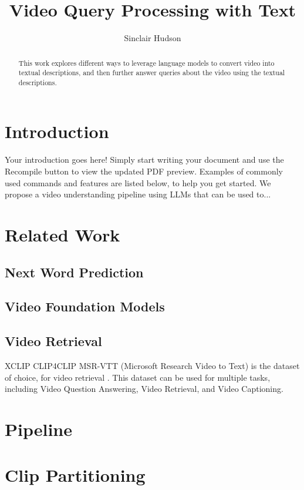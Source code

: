 \documentclass{article}
\title{Video Query Processing with Text}
\author{Sinclair Hudson}
\begin{document}
\maketitle

\begin{abstract}
      This work explores different ways to leverage language models to convert video into textual descriptions, and then further answer queries about the video using the textual descriptions.
\end{abstract}

\section{Introduction}

Your introduction goes here! Simply start writing your document and use the Recompile button to view the updated PDF preview. Examples of commonly used commands and features are listed below, to help you get started.
We propose a video understanding pipeline using LLMs that can be used to...

\section{Related Work}

\subsection{Next Word Prediction}

\subsection{Video Foundation Models}

\subsection{Video Retrieval}

XCLIP \cite{}
CLIP4CLIP \cite{}
MSR-VTT (Microsoft Research Video to Text) is the dataset of choice, for video retrieval \cite{}.
This dataset can be used for multiple tasks, including Video Question Answering, Video Retrieval, and Video Captioning.

\section{Pipeline}

\section{Clip Partitioning}
\end{document}

